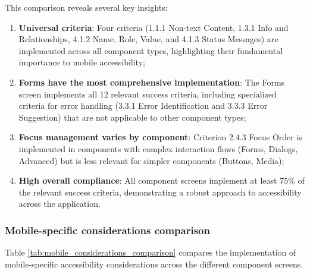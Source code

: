 This comparison reveals several key insights:

\begin{enumerate}
    \item \textbf{Universal criteria}: Four criteria (1.1.1 Non-text Content, 1.3.1 Info and Relationships, 4.1.2 Name, Role, Value, and 4.1.3 Status Messages) are implemented across all component types, highlighting their fundamental importance to mobile accessibility;
    
    \item \textbf{Forms have the most comprehensive implementation}: The Forms screen implements all 12 relevant success criteria, including specialized criteria for error handling (3.3.1 Error Identification and 3.3.3 Error Suggestion) that are not applicable to other component types;
    
    \item \textbf{Focus management varies by component}: Criterion 2.4.3 Focus Order is implemented in components with complex interaction flows (Forms, Dialogs, Advanced) but is less relevant for simpler components (Buttons, Media);
    
    \item \textbf{High overall compliance}: All component screens implement at least 75\% of the relevant success criteria, demonstrating a robust approach to accessibility across the application.
\end{enumerate}

\subsubsection{Mobile-specific considerations comparison}

Table \ref{tab:mobile_considerations_comparison} compares the implementation of mobile-specific accessibility considerations across the different component screens.

